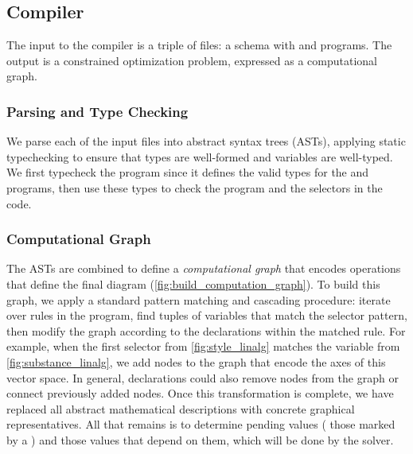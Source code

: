 
\subsection{Compiler}
\label{sec:Compiler}

The input to the compiler is a triple of files: a \Domain{} schema with \Substance{} and \Style{} programs.  The output is a constrained optimization problem, expressed as a computational graph.

\subsubsection{Parsing and Type Checking}
\label{sec:ParsingandTypeChecking}

We parse each of the input files into abstract syntax trees (ASTs), applying static typechecking to ensure that types are well-formed and variables are well-typed.  We first typecheck the \Domain{} program since it defines the valid types for the \Substance{} and \Style{} programs, then use these types to check the \Substance{} program and the selectors in the \Style{} code.

\subsubsection{Computational Graph}
\label{sec:ComputationalGraph}

The ASTs are combined to define a \emph{computational graph} that encodes operations that define the final diagram (\cref{fig:build_computation_graph}).  To build this graph, we apply a standard pattern matching and cascading procedure: iterate over rules in the \Style{} program, find tuples of \Substance{} variables that match the selector pattern, then modify the graph according to the declarations within the matched rule.  For example, when the first selector  from \cref{fig:style_linalg} matches the variable  from \cref{fig:substance_linalg}, we add nodes to the graph that encode the axes of this vector space.  In general, declarations could also remove nodes from the graph or connect previously added nodes.  Once this transformation is complete, we have replaced all abstract mathematical descriptions with concrete graphical representatives.  All that remains is to determine pending values (\ie{} those marked by a ) and those values that depend on them, which will be done by the solver.

